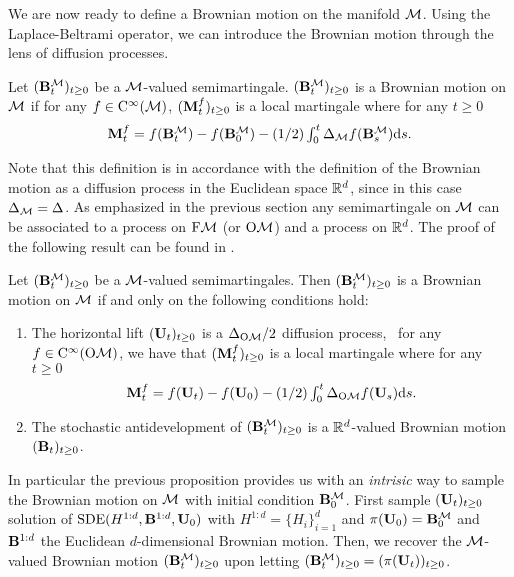 We are now ready to define a Brownian motion on the manifold $\mathcal M$. Using the
Laplace-Beltrami operator, we can introduce the Brownian motion through the lens
of diffusion processes.

\begin{definition}
  Let $(\mathbf{B}_t^\mathcal M)_{t \geq 0}$ be a $\mathcal M$-valued semimartingale.
  $(\mathbf{B}_t^\mathcal M)_{t \geq 0}$ is a Brownian motion on $\mathcal M$ if for any
  $f \in \mathrm{C}^\infty(\mathcal M)$, $(\mathbf{M}_t^f)_{t \geq 0}$ is a local martingale where
  for any $t \geq 0$
  \begin{equation}
    \textstyle{\mathbf{M}_t^f = f(\mathbf{B}_t^\mathcal M) - f(\mathbf{B}_0^\mathcal M) - (1/2)\int_0^t \Delta_{\mathcal M}f(\mathbf{B}_s^\mathcal M) \mathrm{d}s  .}
  \end{equation}
\end{definition}

Note that this definition is in accordance with the definition of the Brownian
motion as a diffusion process in the Euclidean space $\mathbb{R}^d$, since in this
case $\Delta_{\mathcal M} = \Delta$. As emphasized in the previous section any
semimartingale on $\mathcal M$ can be associated to a process on $\mathrm{F}\mathcal{M}$ (or $\mathrm{O}\mathcal{M}$) and a
process on $\mathbb{R}^d$. The proof of the following result can be found in
\citet[Propositions 3.2.1 and 3.2.2]{hsu2002stochastic}.

\begin{proposition}
  \label{prop:intrinsic_brownian}
  Let $(\mathbf{B}_t^\mathcal M)_{t \geq 0}$ be a $\mathcal M$-valued semimartingales. Then
  $(\mathbf{B}_t^\mathcal M)_{t \geq 0}$ is a Brownian motion on $\mathcal M$ if and only on the
  following conditions hold:
  \begin{enumerate}[label=\alph*)]
  \item The horizontal lift $(\mathbf{U}_t)_{t \geq 0}$ is a $\Delta_{\mathrm{O}\mathcal{M}}/2$
    diffusion process, \ie \ for any $f \in \mathrm{C}^\infty(\mathrm{O}\mathcal{M})$, we have that
    $(\mathbf{M}_t^f)_{t \geq 0}$ is a local martingale where for any $t \geq 0$
  \begin{equation}
    \textstyle{\mathbf{M}_t^f = f(\mathbf{U}_t) - f(\mathbf{U}_0) - (1/2)\int_0^t \Delta_{\mathrm{O}\mathcal{M}}f(\mathbf{U}_s) \mathrm{d}s  .}
  \end{equation}    
\item The stochastic antidevelopment of $(\mathbf{B}_t^\mathcal M)_{t \geq 0}$ is a
  $\mathbb{R}^d$-valued Brownian motion $(\mathbf{B}_t)_{t \geq 0}$.
  \end{enumerate}
\end{proposition}

In particular the previous proposition provides us with an \emph{intrisic} way
to sample the Brownian motion on $\mathcal M$ with initial condition $\mathbf{B}_0^\mathcal M$. First
sample $(\mathbf{U}_t)_{t \geq 0}$ solution of $\mathrm{SDE}(H^{1:d}, \mathbf{B}^{1:d}, \mathbf{U}_0)$
with $H^{1:d} = \{H_i\}_{i=1}^d$ and $\pi(\mathbf{U}_0) = \mathbf{B}_0^\mathcal M$ and $\mathbf{B}^{1:d}$ the
Euclidean $d$-dimensional Brownian motion. Then, we recover the $\mathcal M$-valued
Brownian motion $(\mathbf{B}_t^\mathcal M)_{t \geq 0}$ upon letting
$(\mathbf{B}_t^\mathcal M)_{t \geq 0} = (\pi(\mathbf{U}_t))_{t \geq 0}$.

